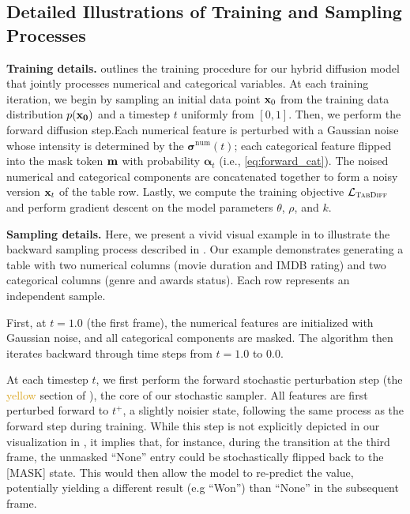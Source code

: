 \begin{rebuttal}
\section{Detailed Illustrations of Training and Sampling Processes}
\label{app:detailed_illustrations_of_training_and_sampling_processes}

\textbf{Training details.}
 outlines the training procedure for our hybrid diffusion model that jointly processes numerical and categorical variables. At each training iteration, we begin by sampling an initial data point $\mathbf{{\mathbf{x}}}_0$ from the training data distribution $p(\mathbf{{\mathbf{x}}_0})$ and a timestep $t$ uniformly from  $[0, 1]$. Then, we perform the forward diffusion step.Each numerical feature is perturbed with a Gaussian noise whose intensity is determined by the $\bm \sigma^{\text{num}}(t)$; each categorical feature flipped into the mask token ${\mathbf{m}}$ with probability $\bm \alpha_t$ (i.e., \cref{eq:forward_cat}). The noised numerical and categorical components are concatenated together to form a noisy version ${\mathbf{x}}_t$ of the table row. Lastly, we compute the training objective ${\mathcal{L}}_\textsc{TabDiff}$ and perform gradient descent on the model parameters $\theta$, $\rho$, and $k$.


\textbf{Sampling details.}
Here, we present a vivid visual example in  to illustrate the backward sampling process described in . Our example demonstrates generating a table with two numerical columns (movie duration and IMDB rating) and two categorical columns (genre and awards status). Each row represents an independent sample.

First, at $t=1.0$ (the first frame), the numerical features are initialized with Gaussian noise, and all categorical components are masked. The algorithm then iterates backward through time steps from $t=1.0$ to $0.0$. 

At each timestep $t$, we first perform the forward stochastic perturbation step (the \textcolor{goldenrod}{yellow} section of ), the core of our stochastic sampler. All features are first perturbed forward to  $t^+$, a slightly noisier state, following the same process as the forward step during training. While this step is not explicitly depicted in our visualization in , it implies that, for instance, during the transition at the third frame, the unmasked “None” entry could be stochastically flipped back to the [MASK] state. This would then allow the model to re-predict the value, potentially yielding a different result (e.g ``Won'') than “None” in the subsequent frame.


\end{rebuttal}
